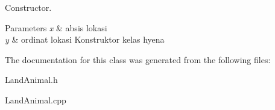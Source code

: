 Constructor. 


\begin{DoxyParams}{Parameters}
{\em x} & absis lokasi \\
\hline
{\em y} & ordinat lokasi Konstruktor kelas hyena \\
\hline
\end{DoxyParams}


The documentation for this class was generated from the following files\+:\begin{DoxyCompactItemize}
\item 
Land\+Animal.\+h\item 
Land\+Animal.\+cpp\end{DoxyCompactItemize}
